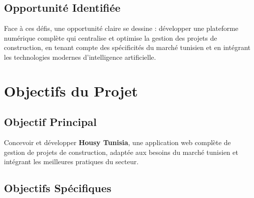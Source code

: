 \documentclass[12pt, a4paper]{report}
\begin{document}
\subsection{Opportunité Identifiée}

Face à ces défis, une opportunité claire se dessine : développer une plateforme numérique complète qui centralise et optimise la gestion des projets de construction, en tenant compte des spécificités du marché tunisien et en intégrant les technologies modernes d'intelligence artificielle.

\section{Objectifs du Projet}

\subsection{Objectif Principal}

Concevoir et développer \textbf{Housy Tunisia}, une application web complète de gestion de projets de construction, adaptée aux besoins du marché tunisien et intégrant les meilleures pratiques du secteur.

\subsection{Objectifs Spécifiques}
\end{document}

